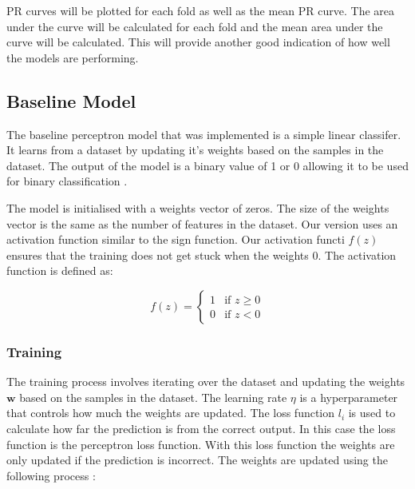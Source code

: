 PR curves will be plotted for each fold as well as the mean PR curve. The area under the curve will be calculated for each fold and the mean area under the curve will be calculated. This will provide another good indication of how well the models are performing.

\subsection{Baseline Model}

%
%
%
%

The baseline perceptron model that was implemented is a simple linear classifer. It learns from a dataset by updating it's weights based on the samples in the dataset. The output of the model is a binary value of 1 or 0 allowing it to be used for binary classification \cite{Marsland2015}. 

The model is initialised with a weights vector of zeros. The size of the weights vector is the same as the number of features in the dataset. Our version uses an activation function similar to the sign function. Our activation functi $f(z)$ ensures that the training does not get stuck when the weights 0. The activation function is defined as:

\[
f(z) = 
\begin{cases} 
1 & \text{if } z \geq 0 \\ 
0 & \text{if } z < 0 
\end{cases}
\]

\subsubsection{Training}

The training process involves iterating over the dataset and updating the weights $\boldsymbol{w}$ based on the samples in the dataset. The learning rate $\eta$ is a hyperparameter that controls how much the weights are updated. The loss function $l_i$ is used to calculate how far the prediction is from the correct output. In this case the loss function is the perceptron loss function. With this loss function the weights are only updated if the prediction is incorrect. The weights are updated using the following process \cite{Marsland2015}:

